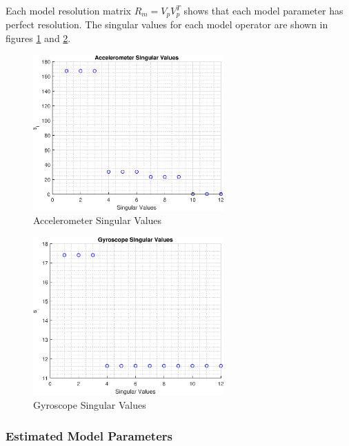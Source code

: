 Each model resolution matrix $R_m = V_p V_p^T$ shows that each model parameter has perfect resolution. The singular values for each model operator are shown in figures \ref{fig: single-axis accelerometer singular values} and \ref{fig: single-axis gyroscope singular values}. 

\begin{figure}[h] 
	\centering
	\includegraphics[width=0.65\textwidth]{./images/SAM_accel_singular_values.eps}
	\caption{Accelerometer Singular Values}
	\label{fig: single-axis accelerometer singular values}
\end{figure}
\FloatBarrier

\begin{figure}[h] 
	\centering
	\includegraphics[width=0.65\textwidth]{./images/SAM_gyro_singular_values.eps}
	\caption{Gyroscope Singular Values}
	\label{fig: single-axis gyroscope singular values}
\end{figure}
\FloatBarrier


\subsubsection{Estimated Model Parameters}


